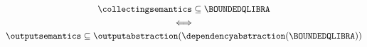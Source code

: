 \begin{gather*}
   \collectingsemantics \subseteq \BOUNDEDQLIBRA \\ \iff \\ \outputsemantics \subseteq \outputabstraction(\dependencyabstraction(\BOUNDEDQLIBRA))
 \end{gather*}
